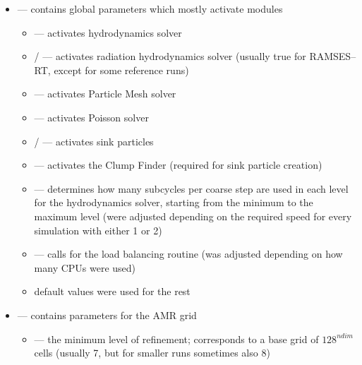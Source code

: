 \begin{itemize}
  \item {} \quad--- contains global parameters which mostly activate modules \\[-9pt]
  \begin{itemize}
    \item {} --- activates hydrodynamics solver \\[-9pt]
    \item {}/ --- activates radiation hydrodynamics solver (usually true for RAMSES--RT, except for some reference runs) \\[-9pt]
    \item {} --- activates Particle Mesh solver \\[-9pt]
    \item {} --- activates Poisson solver \\[-9pt]
    \item {}/ --- activates sink particles \\[-9pt]
    \item {} --- activates the Clump Finder (required for sink particle creation) \\[-9pt]
    \item {} --- determines how many subcycles per coarse step are used in each level for the hydrodynamics solver, starting from the minimum to the maximum level (were adjusted depending on the required speed for every simulation with either 1 or 2) \\[-9pt]
    \item {} --- calls for the load balancing routine (was adjusted depending on how many CPUs were used) \\[-9pt]
    \item default values were used for the rest \\[-3pt]
  \end{itemize}
  \item {} \quad--- contains parameters for the AMR grid \\[-9pt]
  \begin{itemize}
    \item {} --- the minimum level of refinement; corresponds to a base grid of $128^{ndim}$ cells (usually 7, but for smaller runs sometimes also 8) \\[-9pt]

\end{itemize}
\end{itemize}
